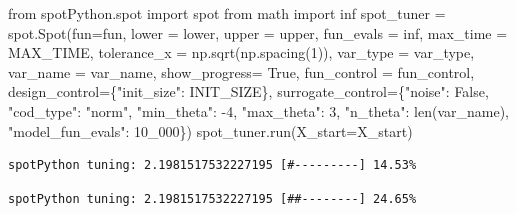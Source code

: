 \documentclass[
  letterpaper,
  DIV=11,
  numbers=noendperiod]{scrreprt}
\newenvironment{Shaded}{\begin{snugshade}}{\end{snugshade}}
\newcommand{\BuiltInTok}[1]{\textcolor[rgb]{0.00,0.23,0.31}{#1}}
\newcommand{\DecValTok}[1]{\textcolor[rgb]{0.68,0.00,0.00}{#1}}
\newcommand{\ImportTok}[1]{\textcolor[rgb]{0.00,0.46,0.62}{#1}}
\newcommand{\NormalTok}[1]{\textcolor[rgb]{0.00,0.23,0.31}{#1}}
\newcommand{\OperatorTok}[1]{\textcolor[rgb]{0.37,0.37,0.37}{#1}}
\newcommand{\StringTok}[1]{\textcolor[rgb]{0.13,0.47,0.30}{#1}}
\newcommand{\VariableTok}[1]{\textcolor[rgb]{0.07,0.07,0.07}{#1}}
\begin{document}
\begin{Shaded}
\begin{Highlighting}[]
\ImportTok{from}\NormalTok{ spotPython.spot }\ImportTok{import}\NormalTok{ spot}
\ImportTok{from}\NormalTok{ math }\ImportTok{import}\NormalTok{ inf}
\NormalTok{spot\_tuner }\OperatorTok{=}\NormalTok{ spot.Spot(fun}\OperatorTok{=}\NormalTok{fun,}
\NormalTok{                   lower }\OperatorTok{=}\NormalTok{ lower,}
\NormalTok{                   upper }\OperatorTok{=}\NormalTok{ upper,}
\NormalTok{                   fun\_evals }\OperatorTok{=}\NormalTok{ inf,}
\NormalTok{                   max\_time }\OperatorTok{=}\NormalTok{ MAX\_TIME,}
\NormalTok{                   tolerance\_x }\OperatorTok{=}\NormalTok{ np.sqrt(np.spacing(}\DecValTok{1}\NormalTok{)),}
\NormalTok{                   var\_type }\OperatorTok{=}\NormalTok{ var\_type,}
\NormalTok{                   var\_name }\OperatorTok{=}\NormalTok{ var\_name,}
\NormalTok{                   show\_progress}\OperatorTok{=} \VariableTok{True}\NormalTok{,}
\NormalTok{                   fun\_control }\OperatorTok{=}\NormalTok{ fun\_control,}
\NormalTok{                   design\_control}\OperatorTok{=}\NormalTok{\{}\StringTok{"init\_size"}\NormalTok{: INIT\_SIZE\},}
\NormalTok{                   surrogate\_control}\OperatorTok{=}\NormalTok{\{}\StringTok{"noise"}\NormalTok{: }\VariableTok{False}\NormalTok{,}
                                      \StringTok{"cod\_type"}\NormalTok{: }\StringTok{"norm"}\NormalTok{,}
                                      \StringTok{"min\_theta"}\NormalTok{: }\OperatorTok{{-}}\DecValTok{4}\NormalTok{,}
                                      \StringTok{"max\_theta"}\NormalTok{: }\DecValTok{3}\NormalTok{,}
                                      \StringTok{"n\_theta"}\NormalTok{: }\BuiltInTok{len}\NormalTok{(var\_name),}
                                      \StringTok{"model\_fun\_evals"}\NormalTok{: }\DecValTok{10\_000}\NormalTok{\})}
\NormalTok{spot\_tuner.run(X\_start}\OperatorTok{=}\NormalTok{X\_start)}
\end{Highlighting}
\end{Shaded}

\begin{verbatim}
spotPython tuning: 2.1981517532227195 [#---------] 14.53% 
\end{verbatim}

\begin{verbatim}
spotPython tuning: 2.1981517532227195 [##--------] 24.65% 
\end{verbatim}
\end{document}

